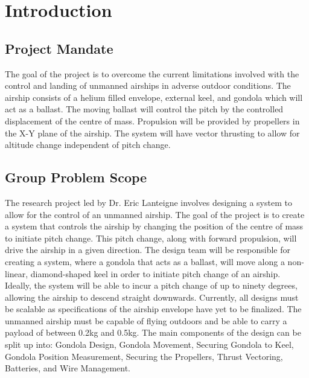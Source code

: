 \documentclass[../main.tex]{subfiles}
\begin{document}
\chapter{Introduction}
\section{Project Mandate} \label{Mandate}
The goal of the project is to overcome the current limitations involved with the control and landing of unmanned airships in adverse outdoor conditions. The airship consists of a helium filled envelope, external keel, and gondola which will act as a ballast. The moving ballast will control the pitch by the controlled displacement of the centre of mass. Propulsion will be provided by propellers in the X-Y plane of the airship. The system will have vector thrusting to allow for altitude change independent of pitch change.

\section{Group Problem Scope} \label{Scope}
The research project led by Dr. Eric Lanteigne involves designing a system to allow for the control of an unmanned airship. The goal of the project is to create a system that controls the airship by changing the position of the centre of mass to initiate pitch change. This pitch change, along with forward propulsion, will drive the airship in a given direction. The design team will be responsible for creating a system, where a gondola that acts as a ballast, will move along a non-linear, diamond-shaped keel in order to initiate pitch change of an airship. Ideally, the system will be able to incur a pitch change of up to ninety degrees, allowing the airship to descend straight downwards. Currently, all designs must be scalable as specifications of the airship envelope have yet to be finalized. The unmanned airship must be capable of flying outdoors and be able to carry a payload of between 0.2kg and 0.5kg. The main components of the design can be split up into: Gondola Design, Gondola Movement, Securing Gondola to Keel, Gondola Position Measurement, Securing the Propellers, Thrust Vectoring, Batteries, and Wire Management.
\end{document}
